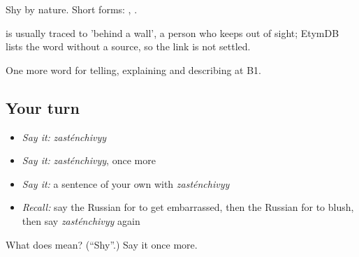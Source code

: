 Shy by nature. Short forms: , .

\begin{cousinweb}
\emph{} is usually traced to \emph{ } 'behind a wall', a person who keeps out of sight; EtymDB lists the word without a source, so the link is not settled.
\end{cousinweb}

\begin{grammarlens}[title={What you've built}]
One more word for telling, explaining and describing at B1.
\end{grammarlens}

\subsection*{Your turn}
\begin{itemize}
\raggedright
  \item \emph{Say it:} \emph{zasténchivyy}
  \item \emph{Say it:} \emph{zasténchivyy}, once more
  \item \emph{Say it:} a sentence of your own with \emph{zasténchivyy}
  \item \emph{Recall:} say the Russian for to get embarrassed, then the Russian for to blush, then say \emph{zasténchivyy} again
\end{itemize}

\begin{tcolorbox}[breakable,colback=teal!4,colframe=teal!35!black,title={Before you move on}]
What does  mean? (\textquotedblleft{}Shy\textquotedblright{}.) Say it once more.
\end{tcolorbox}
